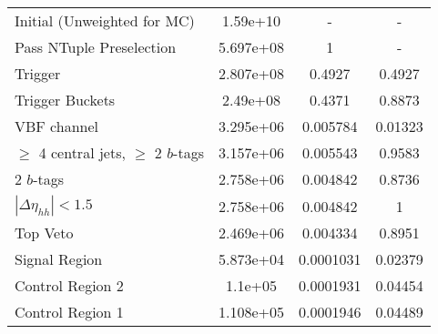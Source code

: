 \begin{table}
{\begin{tabular}{lccc}
\midrule
Initial (Unweighted for MC)            &  1.59e+10 &                      - &                  - \\
Pass NTuple Preselection               & 5.697e+08 &                      1 &                  - \\
Trigger                                & 2.807e+08 &                 0.4927 &             0.4927 \\
Trigger Buckets                        &  2.49e+08 &                 0.4371 &             0.8873 \\
VBF channel                            & 3.295e+06 &               0.005784 &            0.01323 \\
$\ge$ 4 central jets, $\ge$ 2 $b$-tags & 3.157e+06 &               0.005543 &             0.9583 \\
2 $b$-tags                             & 2.758e+06 &               0.004842 &             0.8736 \\
$|\Delta\eta_{hh}| < 1.5$              & 2.758e+06 &               0.004842 &                  1 \\
Top Veto                               & 2.469e+06 &               0.004334 &             0.8951 \\
Signal Region                          & 5.873e+04 &              0.0001031 &            0.02379 \\
Control Region 2                       &   1.1e+05 &              0.0001931 &            0.04454 \\
Control Region 1                       & 1.108e+05 &              0.0001946 &            0.04489 \\
\bottomrule
\end{tabular}
} \ 
\end{table}

